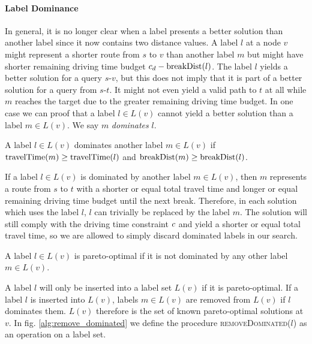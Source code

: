 \paragraph{Label Dominance}
In general, it is no longer clear when a label presents a better solution than another label since it now contains two distance values. A label $l$ at a node $v$ might represent a shorter route from $s$ to $v$ than another label $m$ but might have shorter remaining driving time budget $c_d - \operatorname{breakDist}(l)$. The label $l$ yields a better solution for a query $s$-$v$, but this does not imply that it is part of a better solution for a query from $s$-$t$. It might not even yield a valid path to $t$ at all while $m$ reaches the target due to the greater remaining driving time budget. In one case we can proof that a label $l \in L(v)$ cannot yield a better solution than a label $m \in L(v)$. We say $m$ \emph{dominates} $l$.

\begin{definition}
	A label $l \in L(v)$ dominates another label $m \in L(v)$ if $\operatorname{travelTime}(m) \ge \operatorname{travelTime}(l)$ and $\operatorname{breakDist}(m) \ge \operatorname{breakDist}(l)$.
\end{definition}

If a label $l \in L(v)$ is dominated by another label $m \in L(v)$, then $m$ represents a route from $s$ to $t$ with a shorter or equal total travel time and longer or equal remaining driving time budget until the next break. Therefore, in each solution which uses the label $l$, $l$ can trivially be replaced by the label $m$. The solution will still comply with the driving time constraint $c$ and yield a shorter or equal total travel time, so we are allowed to simply discard dominated labels in our search.

\begin{definition}
	A label $l \in L(v)$ is pareto-optimal if it is not dominated by any other label $m \in L(v)$.
\end{definition}

A label $l$ will only be inserted into a label set $L(v)$ if it is pareto-optimal. If a label $l$ is inserted into $L(v)$, labels $m \in L(v)$ are removed from $L(v)$ if $l$ dominates them. $L(v)$ therefore is the set of known pareto-optimal solutions at $v$. In fig. \ref{alg:remove_dominated} we define the procedure \textsc{removeDominated($l$)} as an operation on a label set.

